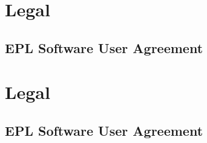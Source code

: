 \ifplastex
\section{Legal}
\label{sec:legal}

\subsection{EPL Software User Agreement}
\label{sec:user-agreement}


\else
  \ifstandalone
  \section{Legal}
  \label{sec:legal}

  \subsection{EPL Software User Agreement}
  \label{sec:user-agreement}

  
  \else
  \fi
\fi


